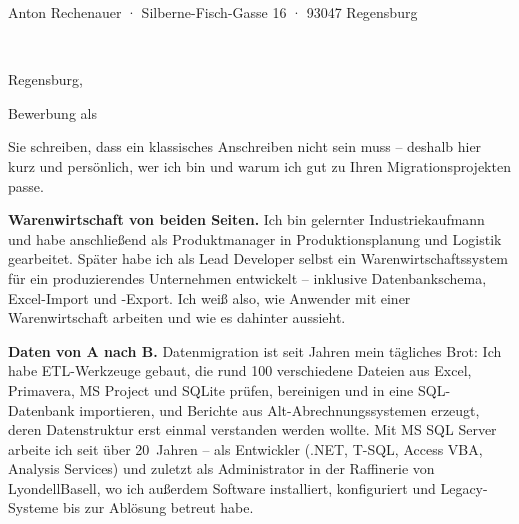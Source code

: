 \documentclass[11pt,a4paper]{article}
\newcommand*{\semibold}{\fontseries{sb}\selectfont}
\newcommand*{\heavy}{\fontseries{k}\selectfont}
\newcommand*{\optline}[1]{\ifdefempty{#1}{}{#1\\}}
\begin{document}
{\footnotesize\color{muted}Anton Rechenauer · Silberne-Fisch-Gasse 16 · 93047 Regensburg}\par
\vspace{2pt}
\begin{minipage}[t]{0.6\textwidth}
  \raggedright
  {\semibold\Firma}\\
  \optline{\Abteilung}%
  \optline{\Ansprechpartner}%
  \optline{\Strasse}%
  \Ort
\end{minipage}%
\hfill
\begin{minipage}[t]{0.35\textwidth}
  \raggedleft
  \vspace{0pt}\par
  Regensburg, \Datum
\end{minipage}

\vspace{1.0cm}

{\large\color{band}\heavy Bewerbung als \Stelle}\par
\vspace{-0.4em}
{\small\color{muted}%
  }\par

\vspace{0.6em}

\Anrede

Sie schreiben, dass ein klassisches Anschreiben nicht sein muss -- deshalb hier kurz und
persönlich, wer ich bin und warum ich gut zu Ihren Migrationsprojekten passe.%

\textbf{Warenwirtschaft von beiden Seiten.} Ich bin gelernter Industriekaufmann und habe
anschließend als Produktmanager in Produktionsplanung und Logistik gearbeitet. Später habe ich
als Lead Developer selbst ein Warenwirtschaftssystem für ein produzierendes Unternehmen
entwickelt -- inklusive Datenbankschema, Excel-Import und -Export. Ich weiß also, wie
Anwender mit einer Warenwirtschaft arbeiten und wie es dahinter aussieht.

\textbf{Daten von A nach B.} Datenmigration ist seit Jahren mein tägliches Brot: Ich habe
ETL-Werkzeuge gebaut, die rund 100 verschiedene Dateien aus Excel, Primavera, MS Project und
SQLite prüfen, bereinigen und in eine SQL-Datenbank importieren, und Berichte aus
Alt-Abrechnungssystemen erzeugt, deren Datenstruktur erst einmal verstanden werden wollte.
Mit MS SQL Server arbeite ich seit über 20~Jahren -- als Entwickler (.NET, T-SQL, Access VBA,
Analysis Services) und zuletzt als Administrator in der Raffinerie von LyondellBasell, wo ich
außerdem Software installiert, konfiguriert und Legacy-Systeme bis zur Ablösung betreut habe.
\end{document}
